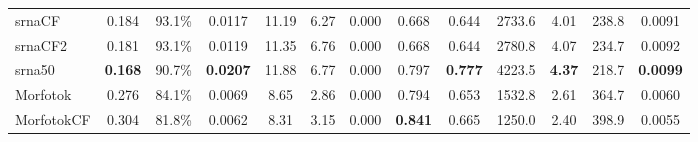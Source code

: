 \begin{table}[htbp]
\begin{tabular}{lcccccccccccc}
srnaCF & 0.184 & 93.1\% & 0.0117 & 11.19 & 6.27 & 0.000 & 0.668 & 0.644 & 2733.6 & 4.01 & 238.8 & 0.0091 \\
srnaCF2 & 0.181 & 93.1\% & 0.0119 & 11.35 & 6.76 & 0.000 & 0.668 & 0.644 & 2780.8 & 4.07 & 234.7 & 0.0092 \\
srna50 & \textbf{0.168} & 90.7\% & \textbf{0.0207} & 11.88 & 6.77 & 0.000 & 0.797 & \textbf{0.777} & 4223.5 & \textbf{4.37} & 218.7 & \textbf{0.0099} \\
Morfotok & 0.276 & 84.1\% & 0.0069 & 8.65 & 2.86 & 0.000 & 0.794 & 0.653 & 1532.8 & 2.61 & 364.7 & 0.0060 \\
MorfotokCF & 0.304 & 81.8\% & 0.0062 & 8.31 & 3.15 & 0.000 & \textbf{0.841} & 0.665 & 1250.0 & 2.40 & 398.9 & 0.0055 \\
\bottomrule
\end{tabular}
\end{table}